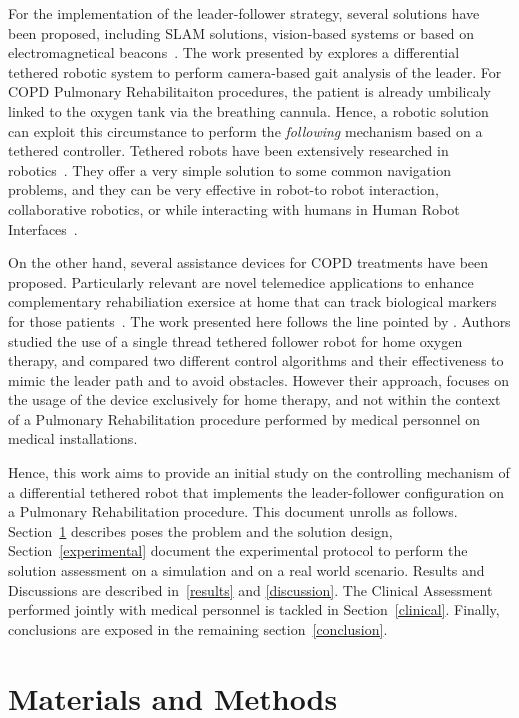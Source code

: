 \documentclass[journal]{IEEEtran}
\begin{document}
For the implementation of the leader-follower strategy, several solutions have been proposed, including SLAM solutions, vision-based systems or based on electromagnetical beacons~\cite{Islam2019}.   The work presented by \cite{Ortlieb2016} explores a differential tethered robotic system to perform camera-based gait analysis of the leader.  For COPD Pulmonary Rehabilitaiton procedures, the patient is already umbilicaly linked to the oxygen tank via the breathing cannula.  Hence, a robotic solution can exploit this circumstance to perform the \textit{following} mechanism based on a tethered controller. Tethered robots have been extensively researched in robotics~\cite{Ahn2006}.  They offer a very simple solution to some common navigation problems, and they can be very effective in robot-to robot interaction, collaborative robotics, or while interacting with humans in Human Robot Interfaces~\cite{Rekleitis2001,Hirata2009,Ferrin2010}. 

On the other hand, several assistance devices for COPD treatments have been proposed.  Particularly relevant are novel telemedice applications to enhance complementary rehabiliation exersice at home that can track biological markers for those patients~\cite{Wu2012}.  The work presented here follows the line pointed by \cite{Endo2015}.  Authors studied the use of a single thread tethered follower robot for home oxygen therapy, and compared two different control algorithms and their effectiveness to mimic the leader path and to avoid obstacles.  However their approach, focuses on the usage of the device exclusively for home therapy, and not within the context of a Pulmonary Rehabilitation procedure performed by medical personnel on medical installations.

Hence, this work aims to provide an initial study on the controlling mechanism of a differential tethered robot that implements the leader-follower configuration on a Pulmonary Rehabilitation procedure.  This document unrolls as follows.  Section~\ref{materials} describes poses the problem and the solution design, Section~\ref{experimental} document the experimental protocol to perform the solution assessment on a simulation and on a real world scenario.  Results and Discussions are described in~\ref{results} and \ref{discussion}. The Clinical Assessment performed jointly with medical personnel is tackled in Section~\ref{clinical}.  Finally, conclusions are exposed in the remaining section~\ref{conclusion}.

\section{Materials and Methods}
\label{materials}
\end{document}
